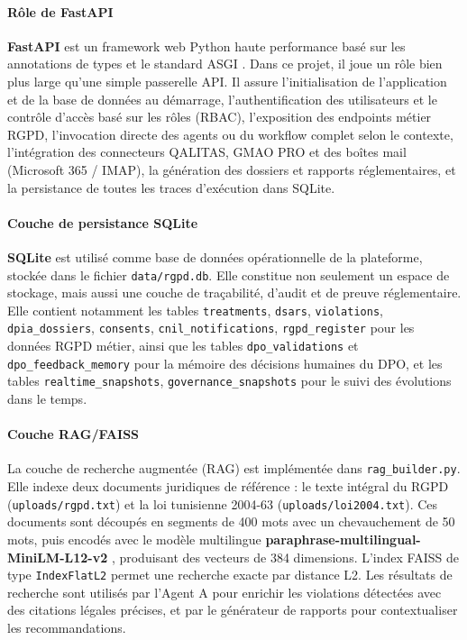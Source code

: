 \documentclass[12pt,a4paper]{report}
\begin{document}
\paragraph{Rôle de FastAPI}

\textbf{FastAPI} est un framework web Python haute performance basé sur les annotations de types et le standard ASGI \cite{fastapi_doc}. Dans ce projet, il joue un rôle bien plus large qu'une simple passerelle API. Il assure l'initialisation de l'application et de la base de données au démarrage, l'authentification des utilisateurs et le contrôle d'accès basé sur les rôles (RBAC), l'exposition des endpoints métier RGPD, l'invocation directe des agents ou du workflow complet selon le contexte, l'intégration des connecteurs QALITAS, GMAO PRO et des boîtes mail (Microsoft 365 / IMAP), la génération des dossiers et rapports réglementaires, et la persistance de toutes les traces d'exécution dans SQLite.

\paragraph{Couche de persistance SQLite}

\textbf{SQLite} est utilisé comme base de données opérationnelle de la plateforme, stockée dans le fichier \texttt{data/rgpd.db}. Elle constitue non seulement un espace de stockage, mais aussi une couche de traçabilité, d'audit et de preuve réglementaire. Elle contient notamment les tables \texttt{treatments}, \texttt{dsars}, \texttt{violations}, \texttt{dpia\_dossiers}, \texttt{consents}, \texttt{cnil\_notifications}, \texttt{rgpd\_register} pour les données RGPD métier, ainsi que les tables \texttt{dpo\_validations} et \texttt{dpo\_feedback\_memory} pour la mémoire des décisions humaines du DPO, et les tables \texttt{realtime\_snapshots}, \texttt{governance\_snapshots} pour le suivi des évolutions dans le temps.

\paragraph{Couche RAG/FAISS}

La couche de recherche augmentée (RAG) est implémentée dans \texttt{rag\_builder.py}. Elle indexe deux documents juridiques de référence : le texte intégral du RGPD (\texttt{uploads/rgpd.txt}) et la loi tunisienne 2004-63 (\texttt{uploads/loi2004.txt}). Ces documents sont découpés en segments de 400 mots avec un chevauchement de 50 mots, puis encodés avec le modèle multilingue \textbf{paraphrase-multilingual-MiniLM-L12-v2} \cite{reimers_sbert}, produisant des vecteurs de 384 dimensions. L'index FAISS de type \texttt{IndexFlatL2} permet une recherche exacte par distance L2. Les résultats de recherche sont utilisés par l'Agent A pour enrichir les violations détectées avec des citations légales précises, et par le générateur de rapports pour contextualiser les recommandations.
\end{document}
